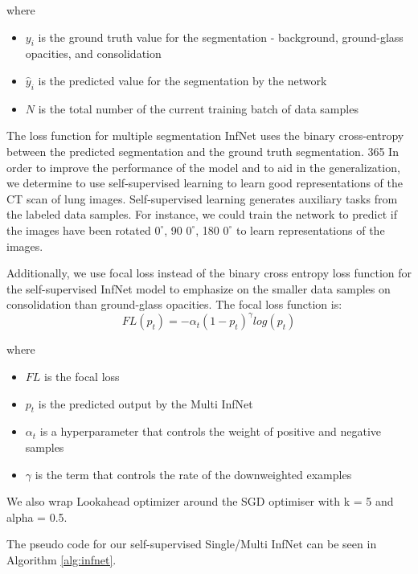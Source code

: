 where 

\begin{itemize}
	\item $y_i$ is the ground truth value for the segmentation - background, ground-glass opacities, and consolidation
	\item $\hat{y}_i$ is the predicted value for the segmentation by the network
	\item $N$ is the total number of the current training batch of data samples
\end{itemize}

The loss function for multiple segmentation InfNet uses the binary cross-entropy between the predicted segmentation and the ground truth segmentation. 
365
%
In order to improve the performance of the model and to aid in the generalization, we determine to use self-supervised learning to learn good representations of the CT scan of lung images. Self-supervised learning generates auxiliary tasks from the labeled data samples. For instance, we could train the network to predict if the images have been rotated $0^\circ$, 90 $0^\circ$, 180 $0^\circ$ to learn representations of the images. 

Additionally, we use focal loss instead of the binary cross entropy loss function for the self-supervised InfNet model to emphasize on the smaller data samples on consolidation than ground-glass opacities. The focal loss function is:
\begin{equation}
FL(p_t) = -\alpha _t(1-p_t)^\gamma log(p_t)
\end{equation}

where
\begin{itemize}
	\item  $FL$ is the focal loss
	\item $p_t$ is the predicted output by the Multi InfNet
	\item $\alpha_t$ is a hyperparameter that controls the weight of positive and negative samples
	\item $\gamma$ is the term that controls the rate of the downweighted examples
\end{itemize}

We also wrap Lookahead optimizer around the SGD optimiser with k = 5 and alpha = 0.5.

The pseudo code for our self-supervised Single/Multi InfNet can be seen in Algorithm \ref{alg:infnet}.


